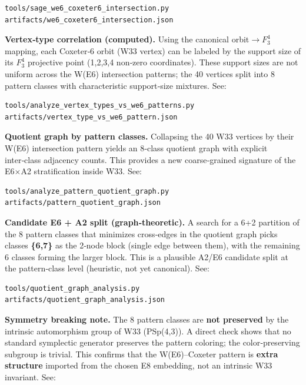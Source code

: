 \documentclass[11pt]{article}
\begin{document}
\begin{verbatim}
tools/sage_we6_coxeter6_intersection.py
artifacts/we6_coxeter6_intersection.json
\end{verbatim}

\textbf{Vertex‑type correlation (computed).} Using the canonical
orbit\ensuremath{\rightarrow}\(F_{3}^{4}\) mapping, each Coxeter‑6 orbit
(W33 vertex) can be labeled by the support size of its \(F_{3}^{4}\)
projective point (1,2,3,4 non‑zero coordinates). These support sizes are
not uniform across the W(E6) intersection patterns; the 40 vertices
split into 8 pattern classes with characteristic support‑size mixtures.
See:

\begin{verbatim}
tools/analyze_vertex_types_vs_we6_patterns.py
artifacts/vertex_type_vs_we6_pattern.json
\end{verbatim}

\textbf{Quotient graph by pattern classes.} Collapsing the 40 W33
vertices by their W(E6) intersection pattern yields an 8‑class quotient
graph with explicit inter‑class adjacency counts. This provides a new
coarse‑grained signature of the E6\ensuremath{\times}A2 stratification
inside W33. See:

\begin{verbatim}
tools/analyze_pattern_quotient_graph.py
artifacts/pattern_quotient_graph.json
\end{verbatim}

\textbf{Candidate E6 + A2 split (graph‑theoretic).} A search for a 6+2
partition of the 8 pattern classes that minimizes cross‑edges in the
quotient graph picks classes \textbf{\{6,7\}} as the 2‑node block
(single edge between them), with the remaining 6 classes forming the
larger block. This is a plausible A2/E6 candidate split at the
pattern‑class level (heuristic, not yet canonical). See:

\begin{verbatim}
tools/quotient_graph_analysis.py
artifacts/quotient_graph_analysis.json
\end{verbatim}

\textbf{Symmetry breaking note.} The 8 pattern classes are \textbf{not
preserved} by the intrinsic automorphism group of W33 (PSp(4,3)). A
direct check shows that no standard symplectic generator preserves the
pattern coloring; the color‑preserving subgroup is trivial. This
confirms that the W(E6)--Coxeter pattern is \textbf{extra structure}
imported from the chosen E8 embedding, not an intrinsic W33 invariant.
See:
\end{document}
